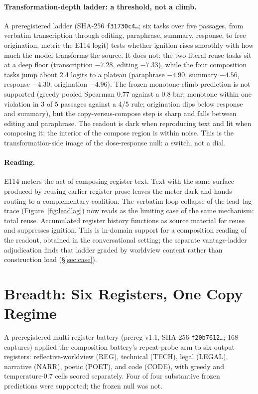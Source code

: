 \documentclass[10pt,a4paper,twocolumn]{article}
\begin{document}
\paragraph{Transformation-depth ladder: a threshold, not a climb.}
A preregistered ladder (SHA-256 \texttt{f31730c4\ldots}; six tasks over five
passages, from verbatim transcription through editing, paraphrase, summary,
response, to free origination, metric the E114 logit) tests whether ignition
rises smoothly with how much the model transforms the source. It does not: the
two literal-reuse tasks sit at a deep floor (transcription $-7.28$, editing
$-7.33$), while the four composition tasks jump about 2.4 logits to a plateau
(paraphrase $-4.90$, summary $-4.56$, response $-4.30$, origination $-4.96$).
The frozen monotone-climb prediction is not supported (greedy pooled Spearman
$0.77$ against a $0.8$ bar; monotone within one violation in 3 of 5 passages
against a 4/5 rule; origination dips below response and summary), but the
copy-versus-compose step is sharp and falls between editing and paraphrase. The
readout is dark when reproducing text and lit when composing it; the interior
of the compose region is within noise. This is the transformation-side image of
the dose-response null: a switch, not a dial.

\paragraph{Reading.}
E114 meters the act of composing register text. Text with the same surface
produced by reusing earlier register prose leaves the meter dark and hands
routing to a complementary coalition. The verbatim-loop collapse of the
lead--lag trace (Figure~\ref{fig:leadlag}) now reads as the limiting case of
the same mechanism: total reuse. Accumulated register history functions as
source material for reuse and suppresses ignition. This is
in-domain support for a composition reading of the readout, obtained in
the conversational setting; the separate vantage-ladder adjudication finds that
ladder graded by worldview content rather than construction load
(\S\ref{sec:case}).

\section{Breadth: Six Registers, One Copy Regime}\label{sec:breadth}

A preregistered multi-register battery (prereg v1.1, SHA-256
\texttt{f20b7612\ldots}; 168 captures) applied the composition battery's
repeat-probe arm to six output registers: reflective-worldview (REG),
technical (TECH), legal (LEGAL), narrative (NARR), poetic (POET), and code
(CODE), with greedy and temperature-$0.7$ cells scored separately. Four of
four substantive frozen predictions were supported; the frozen null was not.
\end{document}
